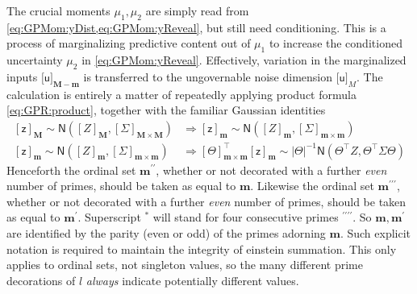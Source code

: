 \documentclass[preprint,12pt]{elsarticle}
\newcommand*{\M}[1]{\ensuremath{#1}\xspace}
\newcommand*{\x}{\times}
\newcommand*{\mi}[1]{\mathbf{#1}}
\newcommand*{\rv}[1]{\mathsf{#1}}
\newcommand*{\te}[2][]{\left\lbrack{#2}\right\rbrack_{#1}}
\newcommand*{\tte}[2][]{\lbrack{#2}\rbrack_{#1}}
\newcommand*{\gauss}[2]{\mathsf{N}\!\left({#1,#2}\right)}
\newcommand*{\modulus}[1]{\M{\left\lvert{#1}\right\rvert}}
\begin{document}
    The crucial moments $\mu_{1},\mu_{2}$ are simply read from \cref{eq:GPMom:yDist,eq:GPMom:yReveal}, but still need conditioning. This is a process of marginalizing predictive content out of $\mu_{1}$ to increase the conditioned uncertainty $\mu_2$ in \cref{eq:GPMom:yReveal}. Effectively, variation in the marginalized inputs $\tte[\mi{M-m}]{\rv{u}}$ is transferred to the ungovernable noise dimension $\tte[M]{\rv{u}}$. The calculation is entirely a matter of repeatedly applying product formula \cref{eq:GPR:product}, together with the familiar Gaussian identities
    \begin{equation*}
        \begin{aligned}
            \te[\mi{M}]{\rv{z}} \sim \gauss{\te[\mi{M}]{Z}}{\te[\mi{M}\x\mi{M}]{\Sigma}} &\Rightarrow
            \te[\mi{m}]{\rv{z}} \sim \gauss{\te[\mi{m}]{Z}}{\te[\mi{m}\x\mi{m}]{\Sigma}} \\
            \te[\mi{m}]{\rv{z}} \sim \gauss{\te[\mi{m}]{Z}}{\te[\mi{m}\x\mi{m}]{\Sigma}} &\Rightarrow
            \te[\mi{m}\x\mi{m}]{\Theta}^{\intercal}\te[\mi{m}]{\rv{z}} \sim 
            \modulus{\Theta}^{-1}
            \gauss{\Theta^{\intercal}Z}{\Theta^{\intercal}\Sigma\Theta}                        
        \end{aligned}
    \end{equation*}
    Henceforth the ordinal set $\mi{m^{\prime\prime}}$, whether or not decorated with a further \emph{even} number of primes, should be taken as equal to $\mi{m}$. 
    Likewise the ordinal set $\mi{m^{\prime\prime\prime}}$, whether or not decorated with a further \emph{even} number of primes, should be taken as equal to $\mi{m^{\prime}}$. Superscript $^{*}$ will stand for four consecutive primes $^{\prime\prime\prime\prime}$. So $\mi{m}, \mi{m^{\prime}}$ are identified by the parity (even or odd) of the primes adorning $\mi{m}$. Such explicit notation is required to maintain the integrity of einstein summation. This only applies to ordinal sets, not singleton values, so the many different prime decorations of $l$ \emph{always} indicate potentially different values.
\end{document}
